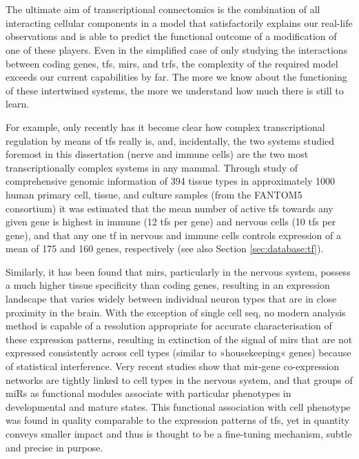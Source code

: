 \section[Nested Multimodal Transcriptional Interactions - The Need for Connectomics]{}
The ultimate aim of transcriptional connectomics is the combination of all interacting cellular components in a model that satisfactorily explains our real-life observations and is able to predict the functional outcome of a modification of one of these players. Even in the simplified case of only studying the interactions between coding genes, \acp{tf}, \acp{mir}, and \acp{trf}, the complexity of the required model exceeds our current capabilities by far. The more we know about the functioning of these intertwined systems, the more we understand how much there is still to learn. 

For example, only recently has it become clear how complex transcriptional regulation by means of \acp{tf} really is, and, incidentally, the two systems studied foremost in this dissertation (nerve and immune cells) are the two most transcriptionally complex systems in any mammal. Through study of comprehensive genomic information of 394 tissue types in approximately 1000 human primary cell, tissue, and culture samples (from the FANTOM5 consortium) it was estimated that the mean number of active \acp{tf} towards any given gene is highest in immune (12 \acp{tf} per gene) and nervous cells (10 \acp{tf} per gene), and that any one \ac{tf} in nervous and immune cells controls expression of a mean of 175 and 160 genes, respectively\cite{Marbach2016} (see also Section \ref{sec:database:tf}). 

Similarly, it has been found that \acp{mir}, particularly in the nervous system, possess a much higher tissue specificity than coding genes, resulting in an expression landscape that varies widely between individual neuron types that are in close proximity in the brain. With the exception of single cell \ac{seq}, no modern analysis method is capable of a resolution appropriate for accurate characterisation of these expression patterns, resulting in extinction of the signal of \acp{mir} that are not expressed consistently across cell types (similar to »housekeeping« genes) because of statistical interference. Very recent studies show that \ac{mir}-gene co-expression networks are tightly linked to cell types in the nervous system, and that groups of miRs as functional modules associate with particular phenotypes in developmental and mature states.\cite{Nowakowski2018} This functional association with cell phenotype was found in quality comparable to the expression patterns of \acp{tf}, yet in quantity conveys smaller impact and thus is thought to be a fine-tuning mechanism, subtle and precise in purpose. 

